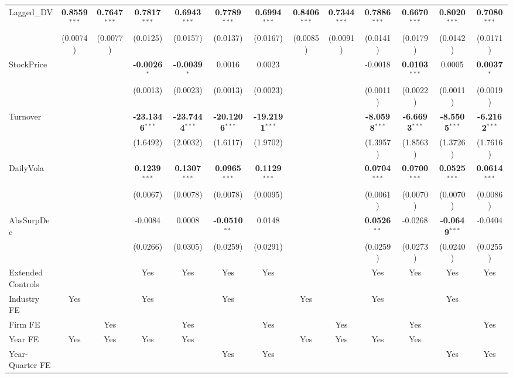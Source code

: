 \documentclass[11pt,a4paper]{article}
\begin{document}
\begin{table}[htbp]
\begin{tabular}{lcccccccccccc}
Lagged\_DV & \textbf{0.8559}$^{***}$ & \textbf{0.7647}$^{***}$ & \textbf{0.7817}$^{***}$ & \textbf{0.6943}$^{***}$ & \textbf{0.7789}$^{***}$ & \textbf{0.6994}$^{***}$ & \textbf{0.8406}$^{***}$ & \textbf{0.7344}$^{***}$ & \textbf{0.7886}$^{***}$ & \textbf{0.6670}$^{***}$ & \textbf{0.8020}$^{***}$ & \textbf{0.7080}$^{***}$ \\
 & (0.0074) & (0.0077) & (0.0125) & (0.0157) & (0.0137) & (0.0167) & (0.0085) & (0.0091) & (0.0141) & (0.0179) & (0.0142) & (0.0171) \\
StockPrice &  &  & \textbf{-0.0026}$^{*}$ & \textbf{-0.0039}$^{*}$ & 0.0016 & 0.0023 &  &  & -0.0018 & \textbf{0.0103}$^{***}$ & 0.0005 & \textbf{0.0037}$^{*}$ \\
 &  &  & (0.0013) & (0.0023) & (0.0013) & (0.0023) &  &  & (0.0011) & (0.0022) & (0.0011) & (0.0019) \\
Turnover &  &  & \textbf{-23.1346}$^{***}$ & \textbf{-23.7444}$^{***}$ & \textbf{-20.1206}$^{***}$ & \textbf{-19.2191}$^{***}$ &  &  & \textbf{-8.0598}$^{***}$ & \textbf{-6.6693}$^{***}$ & \textbf{-8.5505}$^{***}$ & \textbf{-6.2162}$^{***}$ \\
 &  &  & (1.6492) & (2.0032) & (1.6117) & (1.9702) &  &  & (1.3957) & (1.8563) & (1.3726) & (1.7616) \\
DailyVola &  &  & \textbf{0.1239}$^{***}$ & \textbf{0.1307}$^{***}$ & \textbf{0.0965}$^{***}$ & \textbf{0.1129}$^{***}$ &  &  & \textbf{0.0704}$^{***}$ & \textbf{0.0700}$^{***}$ & \textbf{0.0525}$^{***}$ & \textbf{0.0614}$^{***}$ \\
 &  &  & (0.0067) & (0.0078) & (0.0078) & (0.0095) &  &  & (0.0061) & (0.0070) & (0.0070) & (0.0086) \\
AbsSurpDec &  &  & -0.0084 & 0.0008 & \textbf{-0.0510}$^{**}$ & 0.0148 &  &  & \textbf{0.0526}$^{**}$ & -0.0268 & \textbf{-0.0649}$^{***}$ & -0.0404 \\
 &  &  & (0.0266) & (0.0305) & (0.0259) & (0.0291) &  &  & (0.0259) & (0.0273) & (0.0240) & (0.0255) \\
\midrule
Extended Controls &  &  & Yes & Yes & Yes & Yes &  &  & Yes & Yes & Yes & Yes \\
Industry FE & Yes &  & Yes &  & Yes &  & Yes &  & Yes &  & Yes &  \\
Firm FE &  & Yes &  & Yes &  & Yes &  & Yes &  & Yes &  & Yes \\
Year FE & Yes & Yes & Yes & Yes &  &  & Yes & Yes & Yes & Yes &  &  \\
Year-Quarter FE &  &  &  &  & Yes & Yes &  &  &  &  & Yes & Yes \\

\end{tabular}
\end{table}
\end{document}
